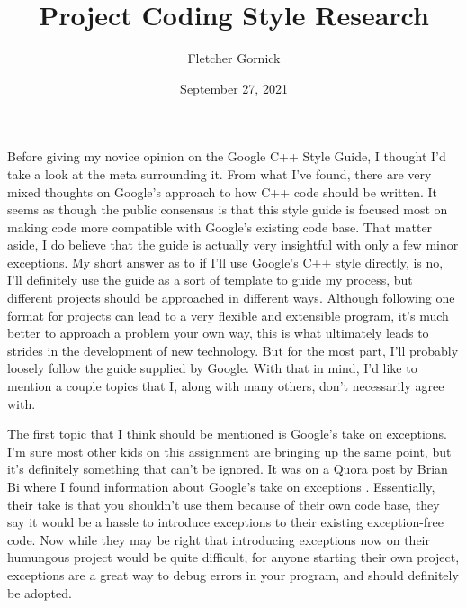 \documentclass[11pt]{article}
\title{Project Coding Style Research}
\author{Fletcher Gornick}
\date{September 27, 2021}
\begin{document}
\maketitle

Before giving my novice opinion on the Google C++ Style Guide, I thought I'd take a look at the 
meta surrounding it.  From what I've found, there are very mixed thoughts on Google's approach 
to how C++ code should be written.  It seems as though the public consensus is that this style 
guide is focused most on making code more compatible with Google's existing code base.  That 
matter aside, I do believe that the guide is actually very insightful with only a few minor 
exceptions.  My short answer as to if I'll use Google's C++ style directly, is no, I'll definitely 
use the guide as a sort of template to guide my process, but different projects should be approached 
in different ways.  Although following one format for projects can lead to a very flexible and 
extensible program, it's much better to approach a problem your own way, this is what ultimately 
leads to strides in the development of new technology.  But for the most part, I'll probably loosely 
follow the guide supplied by Google.  With that in mind, I'd like to mention a couple topics that 
I, along with many others, don't necessarily agree with. 

The first topic that I think should be mentioned is Google's take on exceptions.  I'm sure most 
other kids on this assignment are bringing up the same point, but it's definitely something that 
can't be ignored.  It was on a Quora post by Brian Bi where I found information about Google's 
take on exceptions \cite{brian}.  Essentially, their take is that you shouldn't use them because 
of their own code base, they say it would be a hassle to introduce exceptions to their existing 
exception-free code.  Now while they may be right that introducing exceptions now on their humungous 
project would be quite difficult, for anyone starting their own project, exceptions are a great way 
to debug errors in your program, and should definitely be adopted.
\end{document}
